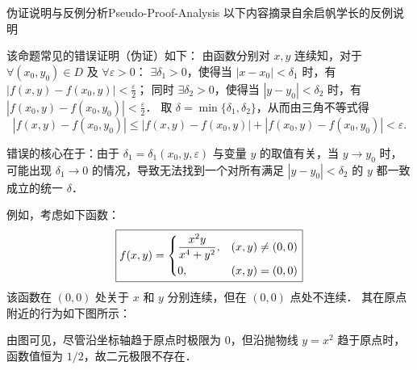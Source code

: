 \begin{note}{伪证说明与反例分析}{Pseudo-Proof-Analysis}
    以下内容摘录自余启帆学长的反例说明 \cite{Yu2021MathAnalysis}

    该命题常见的错误证明（伪证）如下：
    由函数分别对 $x, y$ 连续知，对于 $\forall(x_0, y_0) \in D$ 及 $\forall \varepsilon > 0$：
    $\exists \delta_1 > 0$，使得当 $|x - x_0| < \delta_1$ 时，有 $|f(x, y) - f(x_0, y)| < \frac{\varepsilon}{2}$；
    同时 $\exists \delta_2 > 0$，使得当 $|y - y_0| < \delta_2$ 时，有 $|f(x_0, y) - f(x_0, y_0)| < \frac{\varepsilon}{2}$．
    取 $\delta = \min\{\delta_1, \delta_2\}$，从而由三角不等式得
    \begin{equation}
        |f(x, y) - f(x_0, y_0)| \le |f(x, y) - f(x_0, y)| + |f(x_0, y) - f(x_0, y_0)| < \varepsilon.
    \end{equation}

    错误的核心在于：由于 $\delta_1 = \delta_1(x_0, y, \varepsilon)$ 与变量 $y$ 的取值有关，当 $y \to y_0$ 时，可能出现 $\delta_1 \to 0$ 的情况，导致无法找到一个对所有满足 $|y-y_0|<\delta_2$ 的 $y$ 都一致成立的统一 $\delta$．

    例如，考虑如下函数：
    \begin{equation}
        \boxed{f(x, y) = \begin{dcases} \frac{x^2 y}{x^4 + y^2}, & (x, y) \neq (0, 0) \\ 0, & (x, y) = (0, 0) \end{dcases}}
    \end{equation}
    该函数在 $(0,0)$ 处关于 $x$ 和 $y$ 分别连续，但在 $(0,0)$ 点处不连续．
    其在原点附近的行为如下图所示：

    \begin{center}
    \end{center}

    由图可见，尽管沿坐标轴趋于原点时极限为 $0$，但沿抛物线 $y = x^2$ 趋于原点时，函数值恒为 $1/2$，故二元极限不存在．
\end{note}



